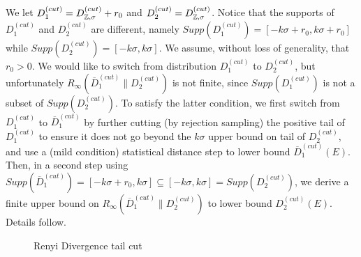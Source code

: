 We let $D_1^{(cut)} = D_{\mathbb{Z},\sigma}^{(cut)} + r_0$ and
$D_2^{(cut)} = D_{\mathbb{Z},\sigma}^{(cut)}$. Notice that the supports of
$D_1^{(cut)}$ and $D_2^{(cut)}$ are different, namely
$Supp(D_1^{(cut)}) = [-k\sigma+r_0,k\sigma+r_0]$ while
$Supp(D_2^{(cut)}) = [-k\sigma,k\sigma]$. We assume, without loss of generality,
that $r_0 > 0$. We would like to switch from distribution $D_1^{(cut)}$ to
$D_2^{(cut)}$, but unfortunately $R_\infty(\overline{D}_1^{(cut)}\|D_2^{(cut)})$
is not finite, since $Supp(D_1^{(cut)})$ is not a subset of
$Supp(D_2^{(cut)})$. To satisfy the latter condition, we first switch from
$D_1^{(cut)}$ to $\overline{D}_1^{(cut)}$ by further cutting (by rejection
sampling) the positive tail of $D_1^{(cut)}$ to ensure it does not go beyond the
$k \sigma$ upper bound on tail of $D_2^{(cut)}$, and use a (mild condition)
statistical distance step to lower bound $\overline{D}_1^{(cut)}(E)$. Then, in a
second step using
$Supp(\overline{D}_1^{(cut)})=[-k\sigma+r_0, k\sigma] \subseteq
[-k\sigma,k\sigma] = Supp(D_2^{(cut)})$, we derive a finite upper bound on
$R_\infty(\overline{D}_1^{(cut)}\|D_2^{(cut)})$ to lower bound
$D_2^{(cut)}(E)$. Details follow.

\begin{figure}[htbp!] 
  \centering
  \caption{Renyi Divergence tail cut}
  \label{fig:tailcut}
\end{figure}

